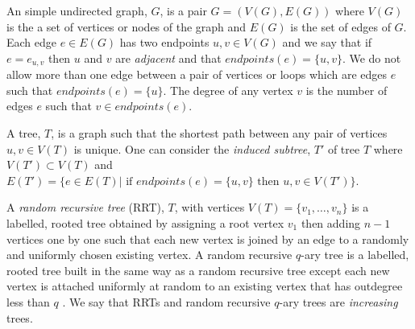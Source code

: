 \documentclass[12pt]{article} %
\theoremstyle{definition}
\begin{document}
An simple undirected graph, $G$, is a pair $G = (V(G),E(G))$ where $V(G)$ is the a set of vertices or nodes of the graph and $E(G)$ is 
the set of edges of $G$.  Each edge $e \in E(G)$ has two endpoints $u,v \in V(G)$ and we say that if $e = e_{u,v}$ then $u$ and $v$ are \emph{adjacent} and that $endpoints(e) = \{u,v\}$.  We do not allow more than one edge between a pair of vertices or loops which are edges $e$ such that $endpoints(e) = \{u\}$. The degree of any vertex $v$ is the number of edges $e$ such that $v \in endpoints(e)$. 

A tree, $T$, is a graph such that the shortest path between any pair of vertices $u,v \in V(T)$ is unique. One can consider the \emph{induced subtree}, $T'$ of tree $T$ where $V(T') \subset V(T)$ and $E(T') = \{e \in E(T)  |  \text{ if } endpoints(e) = \{u,v\} \text{ then } u,v \in V(T')\}$.




A \emph{random recursive tree} (RRT), $T$, with vertices $V(T) = \{v_{1},\dots,v_{n}\}$ is a 
labelled, rooted tree obtained by assigning a root vertex $v_{1}$ then adding $n-1$ vertices 
one by one such that each new vertex is joined by an edge to a randomly and uniformly chosen 
existing vertex. A random recursive $q$-ary tree is a labelled, rooted tree built in the same 
way as a random recursive tree except each new vertex is attached uniformly at random to an 
existing vertex that has outdegree less than $q$ \cite{Berg}.  We say that RRTs and random 
recursive $q$-ary trees are \emph{increasing} trees.  
\end{document}

